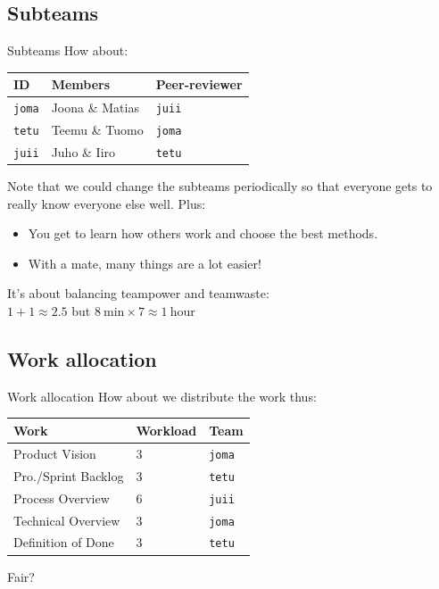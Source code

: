 \documentclass{beamer}
\newcommand{\bgset}[1]{
  \usebackgroundtemplate{
    \texttt{[image: \#1]}
  }
}
\begin{document}
\subsection{Subteams} \bgset{../gfx/neural3__bgmod.jpg}
\begin{frame}{Subteams}{}
  How about:
  \begin{table}
  \begin{tabular}{lll}
  ID & Members & Peer-reviewer \\ \hline
  \texttt{joma} & Joona \& Matias & \texttt{juii} \\
  \texttt{tetu} & Teemu \& Tuomo & \texttt{joma} \\
  \texttt{juii} & Juho \& Iiro & \texttt{tetu} \\
  \end{tabular}
  \end{table}
  \pause Note that we could change the subteams periodically so that everyone
  gets to really know everyone else well. Plus:
  \begin{itemize}
  \pause \item You get to learn how others work and choose the best methods.
  \pause \item With a mate, many things are a lot easier!
  \end{itemize}
  \pause It's about balancing team\alert{power} and team\alert{waste}: \\
  $1 + 1 \approx 2.5$ but $8 ~\textrm{min} \times 7 \approx 1 ~\textrm{hour}$
\end{frame}

\subsection{Work allocation} \bgset{../gfx/neural3__bgmod.jpg}
\begin{frame}{Work allocation}{}
  How about we distribute the work thus:
  \begin{table}
  \begin{tabular}{lll}
  Work & Workload & Team \\ \hline
  \pause Product Vision & 3 & \texttt{joma} \\
  \pause Pro./Sprint Backlog & 3 & \texttt{tetu} \\
  \pause Process Overview & 6 & \texttt{juii} \\
  \pause Technical Overview & 3 & \texttt{joma} \\
  \pause Definition of Done & 3 & \texttt{tetu} \\
  \end{tabular}
  \end{table}
  \pause Fair?
\end{frame}
\end{document}
